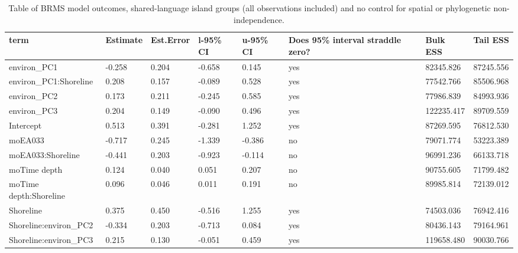 \begin{table}[ht]
\centering
\begin{tabular}{p{5cm}p{2cm}p{2cm}p{2cm}p{2cm}p{2cm}p{2cm}p{2cm}}
  \toprule
term & Estimate & Est.Error & l-95\% CI & u-95\% CI & Does 95\% interval straddle zero? & Bulk ESS & Tail ESS \\ 
  \midrule
environ\_PC1 & -0.258 & 0.204 & -0.658 & 0.145 & yes & 82345.826 & 87245.556 \\ 
  environ\_PC1:Shoreline & 0.208 & 0.157 & -0.089 & 0.528 & yes & 77542.766 & 85506.968 \\ 
  environ\_PC2 & 0.173 & 0.211 & -0.245 & 0.585 & yes & 77986.839 & 84993.936 \\ 
  environ\_PC3 & 0.204 & 0.149 & -0.090 & 0.496 & yes & 122235.417 & 89709.559 \\ 
  Intercept & 0.513 & 0.391 & -0.281 & 1.252 & yes & 87269.595 & 76812.530 \\ 
  moEA033 & -0.717 & 0.245 & -1.339 & -0.386 & no & 79071.774 & 53223.389 \\ 
  moEA033:Shoreline & -0.441 & 0.203 & -0.923 & -0.114 & no & 96991.236 & 66133.718 \\ 
  moTime depth & 0.124 & 0.040 & 0.051 & 0.207 & no & 90755.605 & 71799.482 \\ 
  moTime depth:Shoreline & 0.096 & 0.046 & 0.011 & 0.191 & no & 89985.814 & 72139.012 \\ 
  Shoreline & 0.375 & 0.450 & -0.516 & 1.255 & yes & 74503.036 & 76942.416 \\ 
  Shoreline:environ\_PC2 & -0.334 & 0.203 & -0.713 & 0.084 & yes & 80436.143 & 79164.961 \\ 
  Shoreline:environ\_PC3 & 0.215 & 0.130 & -0.051 & 0.459 & yes & 119658.480 & 90030.766 \\ 
   \bottomrule
\end{tabular}
\caption{Table of BRMS model outcomes, shared-language island groups (all observations included) and no control for spatial or phylogenetic non-independence.} 
\label{BRMS_effects_medium_control_none}
\end{table}

